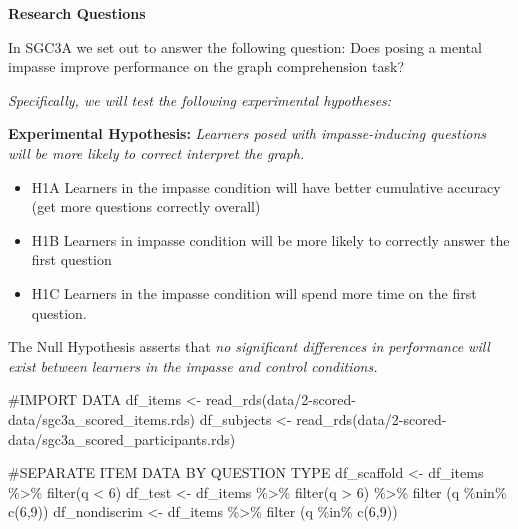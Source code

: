 \documentclass[
  letterpaper,
  DIV=11,
  numbers=noendperiod]{scrreprt}
\newenvironment{Shaded}{\begin{snugshade}}{\end{snugshade}}
\newcommand{\CommentTok}[1]{\textcolor[rgb]{0.37,0.37,0.37}{#1}}
\newcommand{\DecValTok}[1]{\textcolor[rgb]{0.68,0.00,0.00}{#1}}
\newcommand{\FunctionTok}[1]{\textcolor[rgb]{0.28,0.35,0.67}{#1}}
\newcommand{\NormalTok}[1]{\textcolor[rgb]{0.00,0.23,0.31}{#1}}
\newcommand{\OtherTok}[1]{\textcolor[rgb]{0.00,0.23,0.31}{#1}}
\newcommand{\SpecialCharTok}[1]{\textcolor[rgb]{0.37,0.37,0.37}{#1}}
\newcommand{\StringTok}[1]{\textcolor[rgb]{0.13,0.47,0.30}{#1}}
\providecommand{\tightlist}{%
  \setlength{\itemsep}{0pt}\setlength{\parskip}{0pt}}\usepackage{longtable,booktabs,array}
\begin{document}
\textbf{Research Questions}

In SGC3A we set out to answer the following question: Does posing a
mental impasse improve performance on the graph comprehension task?

\emph{Specifically, we will test the following experimental hypotheses:}

\textbf{Experimental Hypothesis:} \emph{Learners posed with
impasse-inducing questions will be more likely to correct interpret the
graph.}

\begin{itemize}
\tightlist
\item
  H1A \textbar{} Learners in the impasse condition will have better
  cumulative accuracy (get more questions correctly overall)
\item
  H1B \textbar{} Learners in impasse condition will be more likely to
  correctly answer the first question
\item
  H1C \textbar{} Learners in the impasse condition will spend more time
  on the first question.
\end{itemize}

The Null Hypothesis asserts that \emph{no significant differences in
performance will exist between learners in the impasse and control
conditions.}

\begin{Shaded}
\begin{Highlighting}[]
\CommentTok{\#IMPORT DATA }
\NormalTok{df\_items }\OtherTok{\textless{}{-}} \FunctionTok{read\_rds}\NormalTok{(}\StringTok{\textquotesingle{}data/2{-}scored{-}data/sgc3a\_scored\_items.rds\textquotesingle{}}\NormalTok{)}
\NormalTok{df\_subjects }\OtherTok{\textless{}{-}} \FunctionTok{read\_rds}\NormalTok{(}\StringTok{\textquotesingle{}data/2{-}scored{-}data/sgc3a\_scored\_participants.rds\textquotesingle{}}\NormalTok{)}


\CommentTok{\#SEPARATE ITEM DATA BY QUESTION TYPE}
\NormalTok{df\_scaffold }\OtherTok{\textless{}{-}}\NormalTok{ df\_items }\SpecialCharTok{\%\textgreater{}\%} \FunctionTok{filter}\NormalTok{(q }\SpecialCharTok{\textless{}} \DecValTok{6}\NormalTok{)}
\NormalTok{df\_test }\OtherTok{\textless{}{-}}\NormalTok{ df\_items }\SpecialCharTok{\%\textgreater{}\%} \FunctionTok{filter}\NormalTok{(q }\SpecialCharTok{\textgreater{}} \DecValTok{6}\NormalTok{) }\SpecialCharTok{\%\textgreater{}\%} \FunctionTok{filter}\NormalTok{ (q }\SpecialCharTok{\%nin\%} \FunctionTok{c}\NormalTok{(}\DecValTok{6}\NormalTok{,}\DecValTok{9}\NormalTok{))}
\NormalTok{df\_nondiscrim }\OtherTok{\textless{}{-}}\NormalTok{ df\_items }\SpecialCharTok{\%\textgreater{}\%} \FunctionTok{filter}\NormalTok{ (q }\SpecialCharTok{\%in\%} \FunctionTok{c}\NormalTok{(}\DecValTok{6}\NormalTok{,}\DecValTok{9}\NormalTok{))}
\end{Highlighting}
\end{Shaded}
\end{document}
